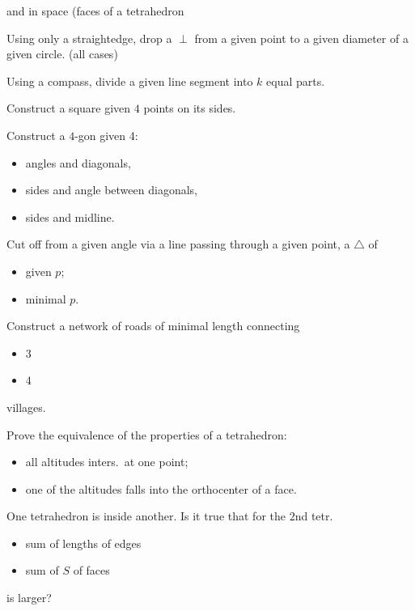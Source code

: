 \documentclass{article}
\begin{document}
and in space (faces of a tetrahedron


\problem  %
Using only a straightedge, drop a $\perp$ from a given point to a given diameter of a given circle. (all cases)


\problem  %
Using a compass, divide a given line segment into $k$ equal parts.


\problem  %
Construct a square given $4$ points on its sides.


\problem  %
Construct a $4$-gon given 4:
\begin{itemize}
  \item[a)] angles and diagonals,
  \item[b)] sides and angle between diagonals,
  \item[c)] sides and midline.
\end{itemize}


\problem  %
Cut off from a given angle via a line passing through a given point, a $\triangle$ of
\begin{itemize}
  \item[a)] given $p$;
  \item[b)] minimal $p$.
\end{itemize}


\problem  %
Construct a network of roads of minimal length connecting
\begin{itemize}
  \item[a)] $3$
  \item[b)] $4$
\end{itemize}
villages.


\setcounter{problemcounter}{47}


\problem  %
Prove the equivalence of the properties of a tetrahedron:
\begin{itemize}
  \item[a)] all altitudes inters.\ at one point;
  \item[b)] one of the altitudes falls into the orthocenter of a face.
\end{itemize}


\problem  %
One tetrahedron is inside another.
Is it true that for the $2$nd tetr.
\begin{itemize}
  \item[a)] sum of lengths of edges
  \item[b)] sum of $S$ of faces
\end{itemize}
is larger?
\end{document}
